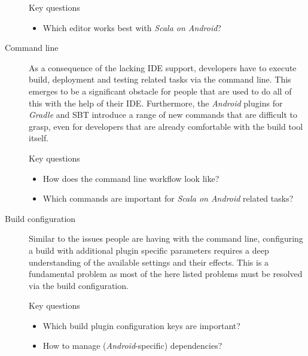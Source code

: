 \begin{description}
\begin{highlight}{Key questions}
\begin{itemize}
			\item Which editor works best with \textit{Scala on Android}?

		\end{itemize}

	\end{highlight}

	\item[Command line]\hfill

	As a consequence of the lacking \ac{IDE} support, developers have to execute build, deployment and testing related tasks via the command line. This emerges to be a significant obstacle for people that are used to do all of this with the help of their \ac{IDE}. Furthermore, the \textit{Android} plugins for \textit{Gradle} and \ac{SBT} introduce a range of new commands that are difficult to grasp, even for developers that are already comfortable with the build tool itself.

	\begin{highlight}{Key questions}

		\begin{itemize}

			\item How does the command line workflow look like?

			\item Which commands are important for \textit{Scala on Android} related tasks?

		\end{itemize}

	\end{highlight}

	\item[Build configuration]\hfill

	Similar to the issues people are having with the command line, configuring a build with additional plugin specific parameters requires a deep understanding of the available settings and their effects. This is a fundamental problem as most of the here listed problems must be resolved via the build configuration.

	\begin{highlight}{Key questions}

		\begin{itemize}

			\item Which build plugin configuration keys are important?

			\item How to manage (\textit{Android}-specific) dependencies?


\end{itemize}
\end{highlight}
\end{description}
